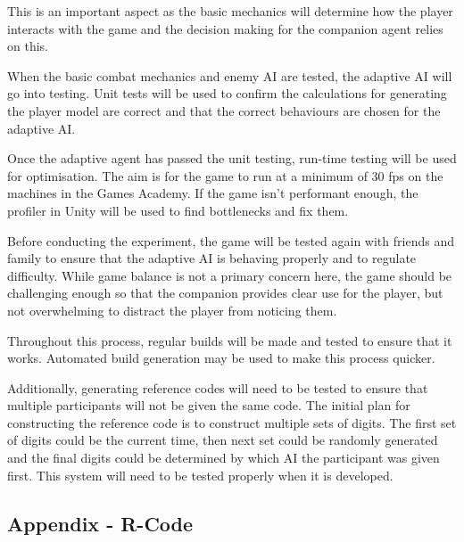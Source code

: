 \documentclass{IEEEtran}
\begin{document}
This is an important aspect as the basic mechanics will determine how the player interacts with the game and the decision making for the companion agent relies on this.

When the basic combat mechanics and enemy AI are tested, the adaptive AI will go into testing. Unit tests will be used to confirm the calculations for generating the player model are correct and that the correct behaviours are chosen for the adaptive AI.

Once the adaptive agent has passed the unit testing, run-time testing will be used for optimisation. The aim is for the game to run at a minimum of 30 fps on the machines in the Games Academy. If the game isn't performant enough, the profiler in Unity will be used to find bottlenecks and fix them.

Before conducting the experiment, the game will be tested again with friends and family to ensure that the adaptive AI is behaving properly and to regulate difficulty. While game balance is not a primary concern here, the game should be challenging enough so that the companion provides clear use for the player, but not overwhelming to distract the player from noticing them.

Throughout this process, regular builds will be made and tested to ensure that it works. Automated build generation may be used to make this process quicker.

Additionally, generating reference codes will need to be tested to ensure that multiple participants will not be given the same code. The initial plan for constructing the reference code is to construct multiple sets of digits. The first set of digits could be the current time, then next set could be randomly generated and the final digits could be determined by which AI the participant was given first. This system will need to be tested properly when it is developed.


\onecolumn
\subsection{Appendix - R-Code}
\label{AppendixRCode}
\end{document}

